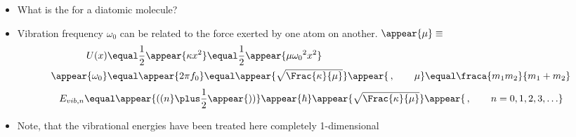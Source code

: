 \begin{frame}
\frametitle{\texorpdfstring{\culine[\sectiontitleulinecolor]{\sectiontitle}}{\sectiontitle} }

\begin{itemize}
	\item What is the  for a diatomic molecule? 
	
	\item Vibration frequency $\omega_{0}$ can be related to the force exerted by one atom on another.   \appear{(}$\appear{\mu}\equiv$  
\[
\begin{aligned}
U(x)&  \equal \frac{1}{2} \appear{\kappa x^{2}}  \equal \frac{1}{2} \appear{\mu \omega_{0}{ }^{2} x^{2}} \\
\appear{\omega_{0}}&  \equal \appear{2 \pi f_{0}}  \equal \appear{\sqrt{\Frac{\kappa}{\mu}} }\appear{\,, \qquad \mu}  \equal \fraca{m_{1} m_{2}}{m_{1}+m_{2}}
\end{aligned}
\]
\[ 
 E_{v i b, n}  \equal  \appear{\textrm{((}n}  \plus \frac{1}{2} \appear{\textrm{))}} \appear{\hbar} \appear{\sqrt{\Frac{\kappa}{\mu}}} \appear{\,, \qquad n=0,1,2,3, \ldots }
 \]

\item Note, that the vibrational energies have been treated here completely 1-dimensional
\end{itemize}


\endofslide 
\end{frame}

